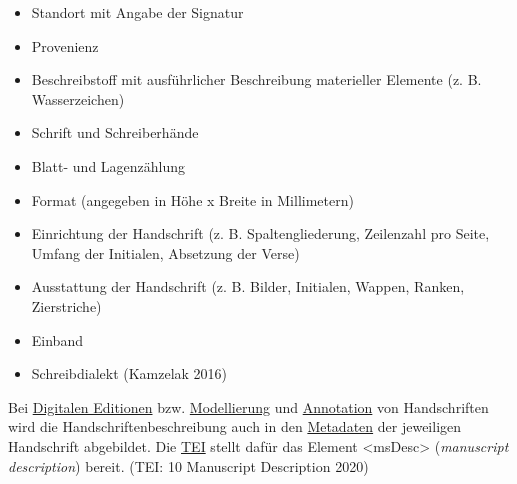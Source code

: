 \documentclass{article}
\begin{document}
        \begin{itemize}\item {                  Standort mit Angabe der Signatur
}\item {Provenienz}\item {Beschreibstoff mit ausführlicher Beschreibung materieller Elemente (z.  B. Wasserzeichen)}\item {Schrift und Schreiberhände}\item {Blatt- und Lagenzählung}\item {Format (angegeben in Höhe x Breite in Millimetern)}\item {                  Einrichtung der Handschrift (z.  B. Spaltengliederung, Zeilenzahl pro Seite, Umfang der Initialen, Absetzung der Verse)
}\item {Ausstattung der Handschrift (z.  B. Bilder, Initialen, Wappen, Ranken, Zierstriche)}\item {Einband}\item {Schreibdialekt (Kamzelak 2016)}\end{itemize}Bei \href{http://gams.uni-graz.at/o:konde.59}{Digitalen Editionen} bzw. \href{http://gams.uni-graz.at/o:konde.137}{Modellierung} und \href{http://gams.uni-graz.at/o:konde.17}{Annotation} von Handschriften wird
                  die Handschriftenbeschreibung auch in den \href{http://gams.uni-graz.at/o:konde.25}{Metadaten} der jeweiligen Handschrift abgebildet. Die
                     \href{http://gams.uni-graz.at/o:konde.178}{TEI} stellt dafür das Element
                     <msDesc> (\emph{manuscript
                     description}) bereit. (TEI: 10 Manuscript Description 2020)\\
            
\end{document}
